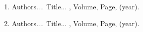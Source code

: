 \begin{enumerate}
    \item Authors....  \newblock
     Title...
      , Volume,
      Page, (year).
    \item Authors....  \newblock
      Title...
       , Volume,
       Page, (year).
\end{enumerate}